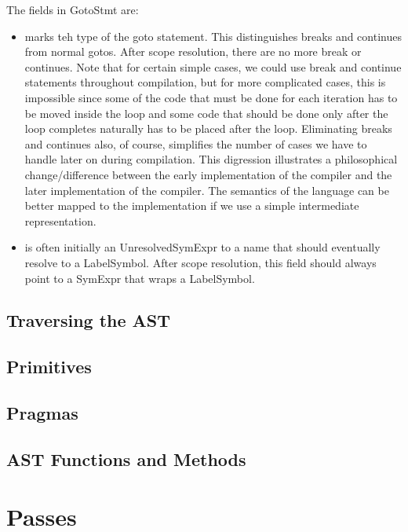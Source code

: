 \documentclass[10pt]{article}
\begin{document}
The fields in GotoStmt are:
\begin{itemize}
\item {} marks teh type of the goto statement.  This
  distinguishes breaks and continues from normal gotos.  After scope
  resolution, there are no more break or continues.  Note that for
  certain simple cases, we could use break and continue statements
  throughout compilation, but for more complicated cases, this is
  impossible since some of the code that must be done for each
  iteration has to be moved inside the loop and some code that should
  be done only after the loop completes naturally has to be placed
  after the loop.  Eliminating breaks and continues also, of course,
  simplifies the number of cases we have to handle later on during
  compilation.  This digression illustrates a philosophical
  change/difference between the early implementation of the compiler
  and the later implementation of the compiler.  The semantics of the
  language can be better mapped to the implementation if we use a
  simple intermediate representation.
\item {} is often initially an UnresolvedSymExpr to a
  name that should eventually resolve to a LabelSymbol.  After scope
  resolution, this field should always point to a SymExpr that wraps a
  LabelSymbol.
\end{itemize}

\subsection{Traversing the AST}
\label{sec:traverse}

\subsection{Primitives}
\label{sec:primitives}

\subsection{Pragmas}
\label{sec:flags}
\label{sec:pragmas}

\subsection{AST Functions and Methods}

\section{Passes}
\label{sec:passes}
\end{document}
